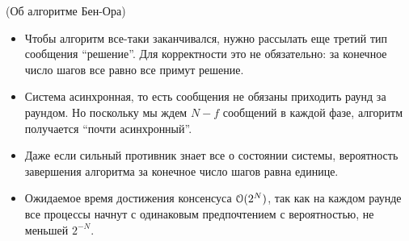\begin{remark}(Об алгоритме Бен-Ора)
    \enewline
    \begin{itemize}
        \item Чтобы алгоритм все-таки заканчивался, нужно рассылать еще третий
            тип сообщения ``решение''. Для корректности это не обязательно:
            за конечное число шагов все равно все примут решение.
        \item Система асинхронная, то есть сообщения не обязаны приходить
            раунд за раундом. Но поскольку мы ждем $N - f$ сообщений в каждой
            фазе, алгоритм получается ``почти асинхронный''.
        \item Даже если сильный противник знает все о состоянии системы,
            вероятность завершения алгоритма за конечное число шагов
            равна единице.
        \item Ожидаемое время достижения консенсуса $\mathcal{O}(2^N)$, так как на каждом
            раунде все процессы начнут с одинаковым предпочтением
            с вероятностью, не меньшей $2^{-N}$.
    \end{itemize}
\end{remark}

